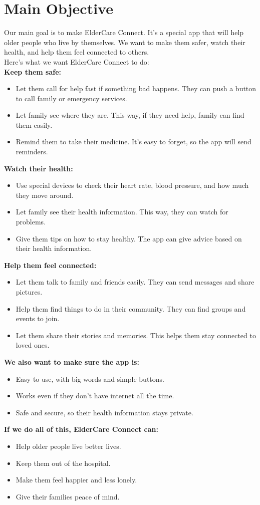 \section{Main Objective}
Our main goal is to make ElderCare Connect. It's a special app that will help older people who live by themselves. We want to make them safer, watch their health, and help them feel connected to others.\\
Here's what we want ElderCare Connect to do:\\
\textbf{Keep them safe:}
\begin{itemize}
    \item Let them call for help fast if something bad happens. They can push a button to call family or emergency services.
    \item Let family see where they are. This way, if they need help, family can find them easily.
    \item Remind them to take their medicine. It's easy to forget, so the app will send reminders.
\end{itemize}
\textbf{Watch their health:}
\begin{itemize}
    \item Use special devices to check their heart rate, blood pressure, and how much they move around.
    \item Let family see their health information. This way, they can watch for problems.
    \item Give them tips on how to stay healthy. The app can give advice based on their health information.
\end{itemize}
\textbf{Help them feel connected:}
\begin{itemize}
    \item Let them talk to family and friends easily. They can send messages and share pictures.
    \item Help them find things to do in their community. They can find groups and events to join.
    \item Let them share their stories and memories. This helps them stay connected to loved ones.
\end{itemize}
\textbf{We also want to make sure the app is:}
\begin{itemize}
    \item Easy to use, with big words and simple buttons.
    \item Works even if they don't have internet all the time.
    \item Safe and secure, so their health information stays private.
\end{itemize}
\textbf{If we do all of this, ElderCare Connect can:}
\begin{itemize}
    \item Help older people live better lives.
    \item Keep them out of the hospital.
    \item Make them feel happier and less lonely.
    \item Give their families peace of mind.
\end{itemize}

